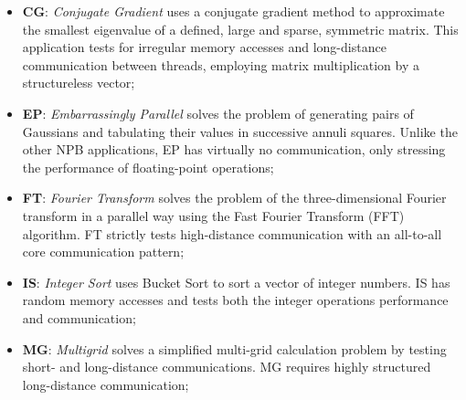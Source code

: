 \documentclass[AMA,final,STIX1COL]{WileyNJD-v2}
\begin{document}
\begin{itemize}

\item \textbf{CG}: \emph{Conjugate Gradient} uses a conjugate gradient method to approximate the smallest eigenvalue of a defined, large and sparse, symmetric matrix. 
This application tests for irregular memory accesses and long-distance communication between threads, employing matrix multiplication by a structureless vector;

\item \textbf{EP}: \emph{Embarrassingly Parallel} solves the problem of generating pairs of Gaussians and tabulating their values in successive annuli squares. 
Unlike the other NPB applications, EP has virtually no communication, only stressing the performance of floating-point operations;

\item \textbf{FT}: \emph{Fourier Transform} solves the problem of the three-dimensional Fourier transform in a parallel way using the Fast Fourier Transform (FFT) algorithm. FT strictly tests high-distance communication with an all-to-all core communication pattern;

\item \textbf{IS}: \emph{Integer Sort} uses Bucket Sort to sort a vector of integer numbers. 
IS has random memory accesses and tests both the integer operations performance and communication;

\item \textbf{MG}: \emph{Multigrid} solves a simplified multi-grid calculation problem by testing short- and long-distance communications. 
MG requires highly structured long-distance communication;


\end{itemize}
\end{document}
